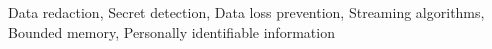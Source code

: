 Data redaction, Secret detection, Data loss prevention, Streaming algorithms, Bounded memory, Personally identifiable information
